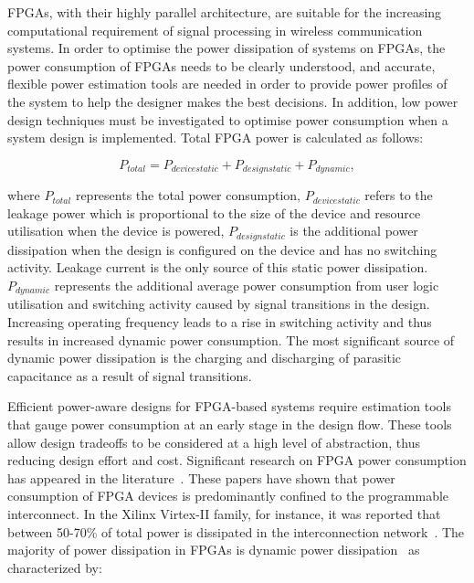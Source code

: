 FPGAs, with their highly parallel architecture, are suitable for the increasing computational requirement of signal processing in wireless communication systems.
In order to optimise the power dissipation of systems on FPGAs, the power consumption of FPGAs needs to be clearly understood, and accurate, flexible power estimation tools are needed in order to provide power profiles of the system to help the designer makes the best decisions.
In addition, low power design techniques must be investigated to optimise power consumption when a system design is implemented.
%
Total FPGA power is calculated as follows:
\begin{center}
\begin{equation}
\label{Equ:Ptotal}
 P_{\mathit{total}} = P_{\mathit{device static}} + P_{\mathit{design static}} + P_{\mathit{dynamic}},
\end{equation}
\end{center}
where $P_{\mathit{total}}$ represents the total power consumption, $P_{\mathit{device static}}$ refers to the leakage power which is proportional to the size of the device and resource utilisation when the device is powered, $P_{\mathit{design static}}$ is the additional power dissipation when the design is configured on the device and has no switching activity. Leakage current is the only source of this static power dissipation.
$P_{\mathit{dynamic}}$ represents the additional average power consumption from user logic utilisation and switching activity caused by signal transitions in the design. Increasing operating frequency leads to a rise in switching activity and thus results in increased dynamic power consumption. The most significant source of dynamic power dissipation is the charging and discharging of parasitic capacitance as a result of signal transitions.

Efficient power-aware designs for FPGA-based systems require estimation tools that gauge power consumption at an early stage in the design flow.
These tools allow design tradeoffs to be considered at a high level of abstraction, thus reducing design effort and cost.
Significant research on FPGA power consumption has appeared in the literature~\cite{Shang2002,Anderson2004a,Anderson2004,Todorovich2005,Reimer2006}.
These papers have shown that power consumption of FPGA devices is predominantly confined to the programmable interconnect.
In the Xilinx Virtex-II family, for instance, it was reported that between 50-70\% of total power is dissipated in the interconnection network~\cite{Shang2002}.
The majority of power dissipation in FPGAs is dynamic power dissipation~\cite{Shang2002} as characterized by:

